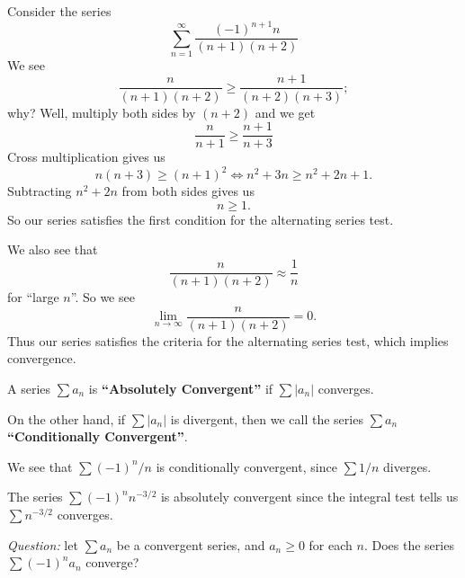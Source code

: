 \begin{example}
Consider the series
\begin{equation}
\sum^{\infty}_{n=1}\frac{(-1)^{n+1}n}{(n+1)(n+2)}
\end{equation}
We see
\begin{equation}
\frac{n}{(n+1)(n+2)}\geq\frac{n+1}{(n+2)(n+3)};
\end{equation}
why? Well, multiply both sides by $(n+2)$ and we get
\begin{equation}
\frac{n}{n+1}\geq \frac{n+1}{n+3}
\end{equation}
Cross multiplication gives us
\begin{equation}
n(n+3)\geq (n+1)^{2} \iff n^{2}+3n \geq n^{2}+2n+1.
\end{equation}
Subtracting $n^{2}+2n$ from both sides gives us
\begin{equation}
n\geq1.
\end{equation}
So our series satisfies the first condition for the alternating
series test.

We also see that
\begin{equation}
\frac{n}{(n+1)(n+2)}\approx\frac{1}{n}
\end{equation}
for ``large $n$''. So we see 
\begin{equation}
\lim_{n\to\infty}\frac{n}{(n+1)(n+2)}=0.
\end{equation}
Thus our series satisfies the criteria for the alternating series
test, which implies convergence.
\end{example}

 A series $\sum a_{n}$ is \textbf{``Absolutely Convergent''}
if $\sum|a_{n}|$ converges.

On the other hand, if $\sum|a_{n}|$ is divergent, then we call
the series $\sum a_{n}$ \textbf{``Conditionally Convergent''}.

\begin{example}
We see that $\sum(-1)^{n}/n$ is conditionally convergent, since
$\sum 1/n$ diverges.
\end{example}
\begin{example}
The series $\sum (-1)^{n}n^{-3/2}$ is absolutely convergent since
the integral test tells us $\sum n^{-3/2}$ converges.
\end{example}

\medbreak\noindent\emph{Question:} let $\sum a_{n}$ be a
convergent series, and $a_{n}\geq0$ for each $n$. Does the series
$\sum (-1)^{n}a_{n}$ converge? 

